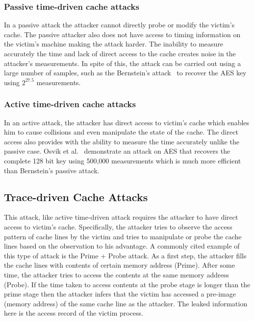 \documentclass[onecolumn]{IEEEtran}
\begin{document}
\subsubsection{Passive time-driven cache attacks}

In a passive attack the attacker cannot directly probe or modify the victim's cache.
The passive attacker also does not have access to timing information on the victim's machine
making the attack harder.  The inability to measure accurately the time and lack of direct
access to the cache creates noise in the attacker's measurements.  In spite of this, the attack
can be carried out using a large number of samples, such as the Bernstein's attack~\cite{bernstein2005cache} to recover the AES key using
$2^{27.5}$ measurements.
 
\subsubsection{Active time-driven cache attacks}

In an active attack, the attacker has direct access to victim's cache which enables him to cause collisions and even manipulate the state of the cache.  The direct access also provides with the ability to measure the time accurately unlike the passive case.  Osvik et al.~\cite{osvik2006cache} demonstrate an attack on AES that recovers the complete 128 bit key using 500,000 measurements which is much more efficient than Bernstein's passive attack.

\subsection{Trace-driven Cache Attacks}

This attack, like active time-driven attack requires the attacker to have direct access to victim's cache.  Specifically, the attacker tries to observe the access pattern of cache lines by the victim and tries to manipulate or probe the cache lines based on the observation to his advantage.  A commonly cited example of this type of attack is the Prime + Probe attack.  As a first step, the attacker fills the cache lines with contents of certain memory address (Prime).  After some time, the attacker tries to access the contents at the same memory address (Probe).  If the time taken to access contents at the probe stage is longer than the prime stage then the attacker infers that the victim has accessed a pre-image (memory address) of the same cache line as the attacker.  The leaked information here is the access record of the victim process.
\end{document}
